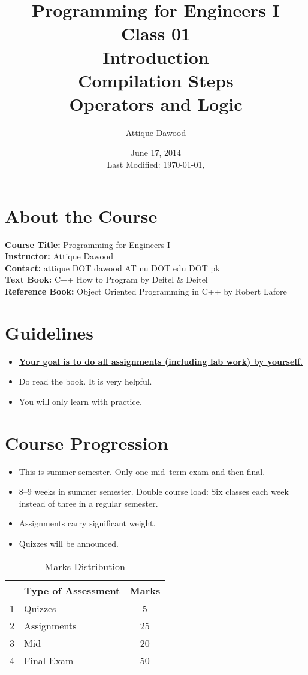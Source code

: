 \documentclass[12pt,a4paper]{article}
\title{Programming for Engineers I\\Class 01\\Introduction\\Compilation Steps\\Operators and Logic}
\author{Attique Dawood}
\date{June 17, 2014\\[0.2cm] Last Modified: \today, \currenttime}
\begin{document}
\maketitle
\section{About the Course}
\textbf{Course Title:} Programming for Engineers I\\
\textbf{Instructor:} Attique Dawood\\
\textbf{Contact:} attique DOT dawood AT nu DOT edu DOT pk\\
\textbf{Text Book:} C++ How to Program by Deitel \& Deitel\\
\textbf{Reference Book:} Object Oriented Programming in C++ by Robert Lafore\\
\section{Guidelines}
\begin{itemize}
\item \textbf{\underline{Your goal is to do all assignments (including lab work) by yourself.}}
\item Do read the book. It is very helpful.
\item You will only learn with practice.
\end{itemize}
\section{Course Progression}
\begin{itemize}
\item This is summer semester. Only one mid--term exam and then final.
\item 8--9 weeks in summer semester. Double course load: Six classes each week instead of three in a regular semester.
\item Assignments carry significant weight.
\item Quizzes will be announced.
\end{itemize}
\begin{table}[H]
\begin{center}
\vspace{0.3cm}
	\begin{tabular}{llc}
	\hline \hline
		\rule{0pt}{2.6ex} & \textbf{Type of Assessment} & \textbf{Marks}\\
		\hline
		1 \rule{0pt}{2.6ex} & Quizzes & 5\\
		2 & Assignments& 25\\
		3 & Mid & 20\\
		4 & Final Exam & 50\\
	\hline \hline
	\end{tabular}
\end{center}
\label{Marks Distribution}
\caption{Marks Distribution}
\end{table}
\end{document}
